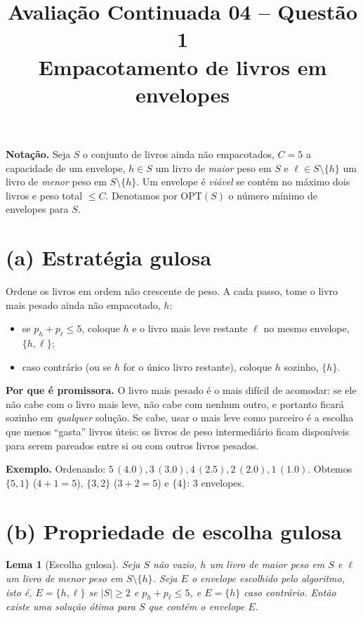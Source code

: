 \documentclass[11pt,a4paper]{article}
\title{Avaliação Continuada 04 -- Questão 1\\ \large Empacotamento de livros em envelopes}
\date{}
\newtheorem{lema}{Lema}
\begin{document}
\maketitle

\noindent\textbf{Notação.} Seja $S$ o conjunto de livros ainda não empacotados,
$C = 5$ a capacidade de um envelope, $h \in S$ um livro de \emph{maior} peso em $S$
e $\ell \in S\setminus\{h\}$ um livro de \emph{menor} peso em $S\setminus\{h\}$.
Um envelope é \emph{viável} se contém no máximo dois livros e peso total $\le C$.
Denotamos por $\mathrm{OPT}(S)$ o número mínimo de envelopes para $S$.

\section*{(a) Estratégia gulosa}

Ordene os livros em ordem não crescente de peso. A cada passo, tome o livro
mais pesado ainda não empacotado, $h$:
\begin{itemize}
  \item se $p_h + p_\ell \le 5$, coloque $h$ e o livro mais leve restante $\ell$
        no mesmo envelope, $\{h,\ell\}$;
  \item caso contrário (ou se $h$ for o único livro restante), coloque $h$ sozinho, $\{h\}$.
\end{itemize}

\noindent\textbf{Por que é promissora.} O livro mais pesado é o mais difícil de
acomodar: se ele não cabe com o livro mais leve, não cabe com nenhum outro, e
portanto ficará sozinho em \emph{qualquer} solução. Se cabe, usar o mais leve como
parceiro é a escolha que menos ``gasta'' livros úteis: os livros de peso
intermediário ficam disponíveis para serem pareados entre si ou com outros
livros pesados.

\noindent\textbf{Exemplo.} Ordenando: $5\,(4.0), 3\,(3.0), 4\,(2.5), 2\,(2.0), 1\,(1.0)$.
Obtemos $\{5,1\}$ ($4+1=5$), $\{3,2\}$ ($3+2=5$) e $\{4\}$: 3 envelopes.

\section*{(b) Propriedade de escolha gulosa}

\begin{lema}[Escolha gulosa]
Seja $S$ não vazio, $h$ um livro de maior peso em $S$ e $\ell$ um livro de menor
peso em $S \setminus \{h\}$. Seja $E$ o envelope escolhido pelo algoritmo, isto é,
$E=\{h,\ell\}$ se $|S|\ge 2$ e $p_h+p_\ell\le 5$, e $E=\{h\}$ caso contrário.
Então existe uma solução ótima para $S$ que contém o envelope $E$.
\end{lema}
\end{document}

